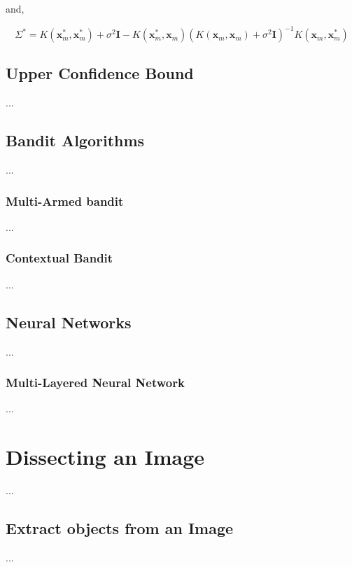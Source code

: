 \documentclass[english]{tktltiki}
\begin{document}
and,

\begin{equation}
\Sigma^* = K(\mathbf{x}_m^*, \mathbf{x}_m^*) + \sigma^2 \mathbf{I} - K(\mathbf{x}_m^*, \mathbf{x}_m)(K(\mathbf{x}_m, \mathbf{x}_m) + \sigma^2 \mathbf{I})^{-1} K(\mathbf{x}_m, \mathbf{x}_m^*)
\end{equation}

\subsection{Upper Confidence Bound}

...

\subsection{Bandit Algorithms}

...

\subsubsection{Multi-Armed bandit}

...

\subsubsection{Contextual Bandit}

...

\subsection{Neural Networks}

...

\subsubsection{Multi-Layered Neural Network}

...

\section{Dissecting an Image}

...

\subsection{Extract objects from an Image}

...
\end{document}
